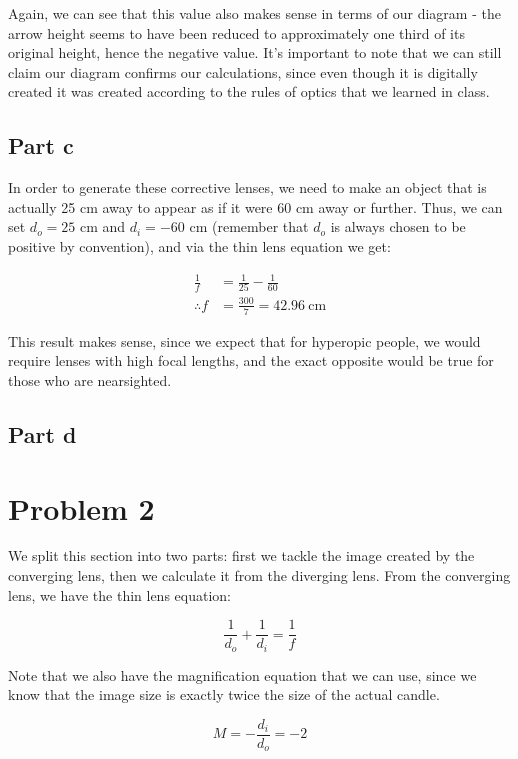 \documentclass{article}
\theoremstyle{definition}
\numberwithin{equation}{section}
\numberwithin{definition}{section}
\begin{document}
Again, we can see that this value also makes sense in terms of our diagram - the arrow height seems to have been reduced to approximately one third of its original height, hence the negative value. It's important to note that we can still claim our diagram confirms our calculations, since even though it is digitally created it was created according to the rules of optics that we learned in class.


\subsection*{Part c}

In order to generate these corrective lenses, we need to make an object that is actually 25 cm away to appear as if it were 60 cm away or further. Thus, we can set $d_o = 25$ cm and $d_i = -60$ cm (remember that $d_o$ is always chosen to be positive by convention), and via the thin lens equation we get:


\begin{align*}
    \frac{1}{f} &= \frac{1}{25} - \frac{1}{60}\\
    \therefore f &= \frac{300}{7} = 42.96 \ \text{cm}
\end{align*}

This result makes sense, since we expect that for hyperopic people, we would require lenses with high focal lengths, and the exact opposite would be true for those who are nearsighted. 

\subsection*{Part d}



\section{Problem 2}

We split this section into two parts: first we tackle the image created by the converging lens, then we calculate it from the diverging lens. From the converging lens, we have the thin lens equation:

\[ \frac{1}{d_o} + \frac{1}{d_i} = \frac{1}{f} \]

Note that we also have the magnification equation that we can use, since we know that the image size is exactly twice the size of the actual candle.

\[ M = -\frac{d_i}{d_o} = -2\]
\end{document}
